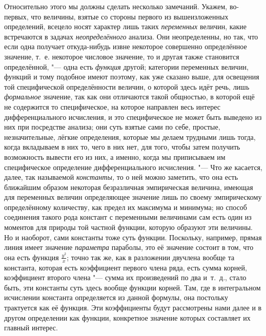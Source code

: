 Относительно этого мы должны сделать несколько замечаний. Укажем, во-первых,
что величины, взятые со стороны первого из вышеизложенных определений, всецело
носят характер лишь таких {\em переменных} величин, какие встречаются в задачах
{\em неопределённого} анализа. Они неопределенны, но так, что если одна
получает откуда-нибудь извне некоторое совершенно определённое значение, т.~е.
некоторое числовое значение, то и другая также становится определённой, "---
одна есть {\em функция} другой; категории переменных величин, функций и тому
подобное имеют поэтому, как уже сказано выше, для освещения той специфической
определённости величин, о которой здесь идёт речь, лишь {\em формальное}
значение, так как они отличаются такой общностью, в которой ещё не содержится
то специфическое, на которое направлен весь интерес дифференциального
исчисления, и это специфическое не может быть выведено из них при посредстве
анализа; они суть взятые сами по себе, простые, незначительные, лёгкие
определения, которые мы делаем трудными лишь тогда, когда вкладываем в них то,
чего в них нет, для того, чтобы затем получить возможность вывести его из них,
а именно, когда мы приписываем им специфическое определение дифференциального
исчисления. "--- Что же касается, далее, так называемой {\em константы,} то о
ней можно заметить, что она есть ближайшим образом некоторая безразличная
эмпирическая величина, имеющая для переменных величин определяющее значение
лишь по своему эмпирическому определённому количеству, как предел их максимума
и минимума; но способ соединения такого рода констант с переменными величинами
сам есть один из моментов для природы той частной функции, которую образуют эти
величины. Но и наоборот, сами константы тоже суть функции. Поскольку, например,
прямая линия имеет значение {\em параметра} параболы, это её значение состоит в
том, что она есть функция $\frac{y^2}x$; точно так же, как в разложении
двучлена вообще та константа, которая есть коэффициент первого члена ряда, есть
сумма корней, коэффициент второго члена "--- сумма их произведений по два
и~т.~д., стало быть, эти константы суть здесь вообще функции корней. Там, где в
интегральном исчислении константа определяется из данной формулы, она постольку
трактуется как её функция. Эти коэффициенты будут рассмотрены нами далее и в
другом определении как функции, конкретное значение которых составляет их
главный интерес.


